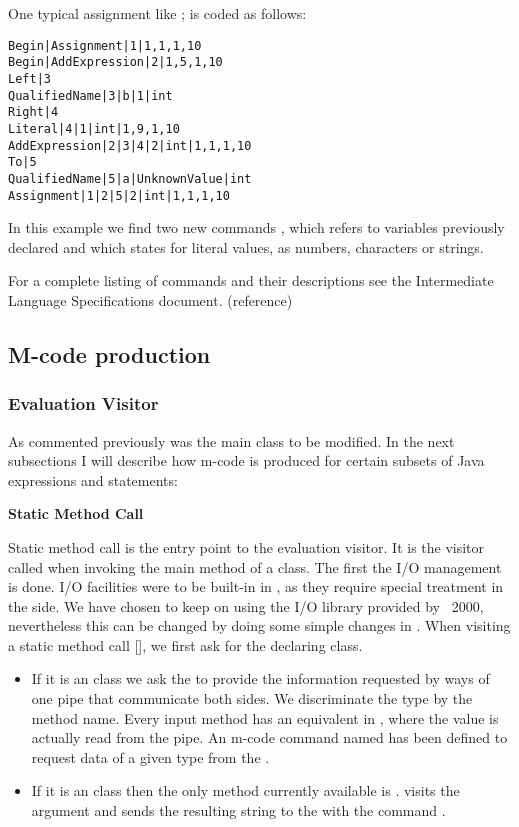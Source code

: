 One typical assignment like ; is coded as follows:
\begin{verbatim}
Begin|Assignment|1|1,1,1,10
Begin|AddExpression|2|1,5,1,10
Left|3
QualifiedName|3|b|1|int
Right|4
Literal|4|1|int|1,9,1,10
AddExpression|2|3|4|2|int|1,1,1,10
To|5
QualifiedName|5|a|UnknownValue|int
Assignment|1|2|5|2|int|1,1,1,10
\end{verbatim}

In this example we find two new commands ,
which refers to variables previously declared and  which states
for literal values, as numbers, characters or strings.

For a complete listing of commands and their descriptions see the
Intermediate Language Specifications document. (reference)

\subsection{M-code production}

\subsubsection{Evaluation Visitor}

As commented previously  was the main class to be
modified. In the next subsections I will describe how {m-code} is produced
for certain subsets of Java expressions and statements:

{\bf{Static Method Call}}

Static method call is the entry point to the evaluation visitor.
It is the visitor called when invoking the main method of a class.
The first the I/O management is done. I/O facilities were to be
built-in in \djava{}, as they require special treatment in the \jel{}
side. We have chosen to keep on using the I/O library provided by
\jel{}~2000, nevertheless this can be changed by doing some simple
changes in . When visiting a static method call
[], we first ask for the
declaring class.

\begin{itemize}
\item If it is an  class we ask the  to provide the information requested by ways of one pipe
that communicate both sides. We discriminate the type by the method name.
Every input method has an equivalent in , where the
value is actually read from the pipe. An m-code command named 
has been defined to request data of a given type from the .
\item If it is an  class then the only method currently available
is . \djava{} visits the argument and sends the resulting
string to the  with the command .
\end{itemize}

